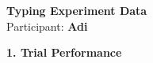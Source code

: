 \documentclass[10pt,a4paper]{article}
\begin{document}

\begin{center}
    {\Large\bfseries Typing Experiment Data}\\
    \vspace{2pt}
    Participant: \textbf{Adi}
\end{center}

\vspace{0.25cm}


\noindent
{\large\bfseries 1. Trial Performance}

\vspace{0.08cm}
\end{document}
